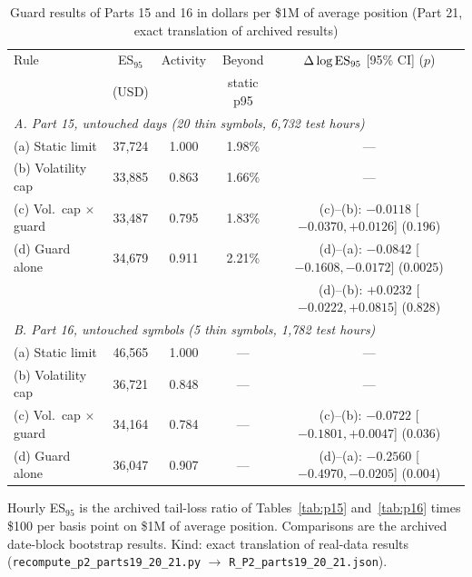 \begin{table}[!tbp]\centering\footnotesize
\begin{threeparttable}
\caption{Guard results of Parts 15 and 16 in dollars per \$1M of average position (Part 21, exact translation of archived results)}\label{tab:p21}
\setlength{\tabcolsep}{1.8pt}
\begin{tabular}{lcccc}
\toprule
Rule & ES$_{95}$ & Activity & Beyond & $\Delta\log{\rm ES}_{95}$ [95\% CI] ($p$)\\
 & (USD) & & static p95 & \\
\midrule
\multicolumn{5}{l}{\emph{A. Part 15, untouched days (20 thin symbols, 6{,}732 test hours)}}\\
(a) Static limit & 37{,}724 & 1.000 & 1.98\% & ---\\
(b) Volatility cap & 33{,}885 & 0.863 & 1.66\% & ---\\
(c) Vol.\ cap $\times$ guard & 33{,}487 & 0.795 & 1.83\% & (c)--(b): $-0.0118$ [$-0.0370, +0.0126$] ($0.196$)\\
(d) Guard alone & 34{,}679 & 0.911 & 2.21\% & (d)--(a): $-0.0842$ [$-0.1608, -0.0172$] ($0.0025$)\\
 & & & & (d)--(b): $+0.0232$ [$-0.0222, +0.0815$] ($0.828$)\\
\midrule
\multicolumn{5}{l}{\emph{B. Part 16, untouched symbols (5 thin symbols, 1{,}782 test hours)}}\\
(a) Static limit & 46{,}565 & 1.000 & --- & ---\\
(b) Volatility cap & 36{,}721 & 0.848 & --- & ---\\
(c) Vol.\ cap $\times$ guard & 34{,}164 & 0.784 & --- & (c)--(b): $-0.0722$ [$-0.1801, +0.0047$] ($0.036$)\\
(d) Guard alone & 36{,}047 & 0.907 & --- & (d)--(a): $-0.2560$ [$-0.4970, -0.0205$] ($0.004$)\\
\bottomrule
\end{tabular}
\begin{tablenotes}\footnotesize\item Hourly ES$_{95}$ is the archived tail-loss ratio of Tables~\ref{tab:p15} and~\ref{tab:p16} times \$100 per basis point on \$1M of average position. Comparisons are the archived date-block bootstrap results. Kind: exact translation of real-data results (\texttt{recompute\_p2\_parts19\_20\_21.py} $\to$ \texttt{R\_P2\_parts19\_20\_21.json}).\end{tablenotes}
\end{threeparttable}
\end{table}

